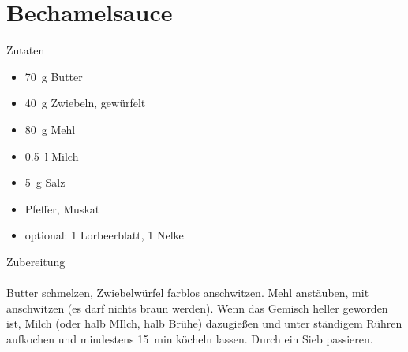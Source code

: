 \section*{Bechamelsauce}
\ihead{}\ohead{}
\cfoot{}
{\Large Zutaten}
\begin{multicols}{2}
\begin{itemize}
    \item \SI{70}{g} Butter
    \item \SI{40}{g} Zwiebeln, gewürfelt
    \item \SI{80}{g} Mehl
    \item \SI{0.5}{l} Milch 
    \item \SI{5}{g} Salz
    \item Pfeffer, Muskat
    \item optional: \num{1} Lorbeerblatt, \num{1} Nelke
\end{itemize}
\end{multicols}
\noindent
{\Large Zubereitung}\\
\\
Butter schmelzen, Zwiebelwürfel farblos anschwitzen.
Mehl anstäuben, mit anschwitzen (es darf nichts braun werden).
Wenn das Gemisch heller geworden ist, Milch (oder halb MIlch, halb Brühe) dazugießen und unter ständigem Rühren aufkochen und mindestens \SI{15}{min} köcheln lassen.
Durch ein Sieb passieren.

